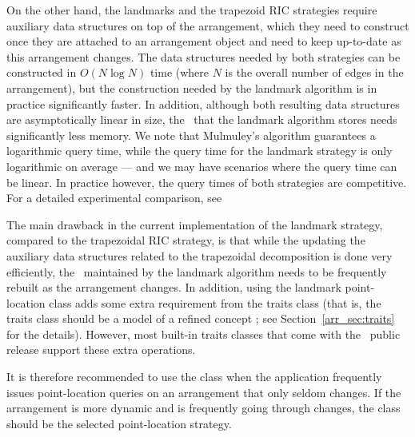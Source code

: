 On the other hand, the landmarks and the trapezoid RIC strategies
require auxiliary data structures on top of the arrangement, which
they need to construct once they are attached to an arrangement
object and need to keep up-to-date as this arrangement changes.
The data structures needed by both strategies can be constructed
in $O(N \log N)$ time (where $N$ is the overall number of edges in
the arrangement),
but the construction needed by the landmark algorithm is in
practice significantly faster. In addition, although both
resulting data structures are asymptotically linear in size, the
\kdtree\ that the landmark algorithm stores needs significantly
less memory. We note that Mulmuley's algorithm guarantees a
logarithmic query time, while the query time for the landmark
strategy is only logarithmic on average --- and we may have
scenarios where the query time can be linear. In practice however,
the query times of both strategies are competitive. For a detailed
experimental comparison, see \cite{cgal:hh-eplca-05}

The main drawback in the current implementation of the landmark
strategy, compared to the trapezoidal RIC strategy, is that while
the updating the auxiliary data structures
related to the trapezoidal decomposition is done very efficiently,
the \kdtree\ maintained by the landmark algorithm needs to be
frequently rebuilt as the arrangement changes. In addition, using
the landmark point-location class adds some extra requirement
from the traits class (that is, the traits class should be a model
of a refined concept ; see
Section~\ref{arr_sec:traits} for the details). However, most
built-in traits classes that come with the \cgal\ public release
support these extra operations.

It is therefore recommended to use the
 class when the application
frequently issues point-location queries on an
arrangement that only seldom changes. If the arrangement is more
dynamic and is frequently going through changes, the
 class should be the
selected point-location strategy.

